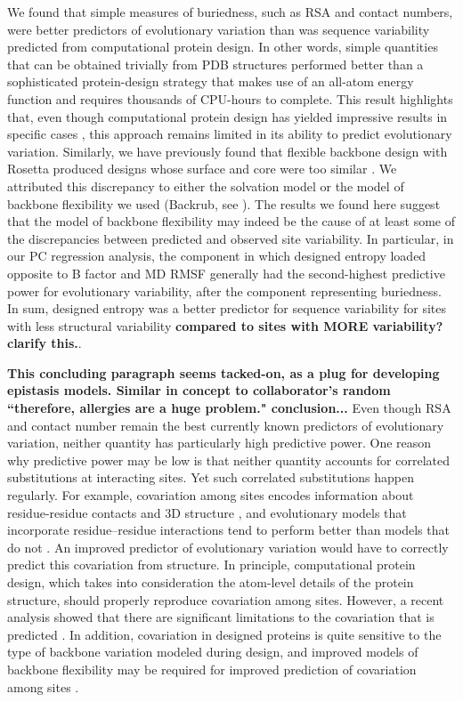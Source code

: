 \documentclass[smallextended]{svjour3}
\begin{document}
We found that simple measures of buriedness, such as RSA and contact numbers, were better predictors of evolutionary variation than was sequence variability predicted from computational protein design. In other words, simple quantities that can be obtained trivially from PDB structures performed better than a sophisticated protein-design strategy that makes use of an all-atom energy function and requires thousands of CPU-hours to complete. This result highlights that, even though computational protein design has yielded impressive results in specific cases \citep{Kuhlman2003,Rothlisberger2008,Fleishman2011}, this approach remains limited in its ability to predict evolutionary variation. Similarly, we have previously found that flexible backbone design with Rosetta produced designs whose surface and core were too similar \citep{Jacksonetal2013}. We attributed this discrepancy to either the solvation model or the model of backbone flexibility we used (Backrub, see \citealt{Smith2008}). The results we found here suggest that the model of backbone flexibility may indeed be the cause of at least some of the discrepancies between predicted and observed site variability. In particular, in our PC regression analysis, the component in which designed entropy loaded opposite to B factor and MD RMSF generally had the second-highest predictive power for evolutionary variability, after the component representing buriedness. In sum, designed entropy was a better predictor for sequence variability for sites with less structural variability \textbf{compared to sites with MORE variability? clarify this.}.

\textbf{This concluding paragraph seems tacked-on, as a plug for developing epistasis models. Similar in concept to collaborator's random ``therefore, allergies are a huge problem." conclusion...}
Even though RSA and contact number remain the best currently known predictors of evolutionary variation, neither quantity has particularly high predictive power. One reason why predictive power may be low is that neither quantity accounts for correlated substitutions at interacting sites.  Yet such correlated substitutions happen regularly. For example, covariation among sites encodes information about residue-residue contacts and 3D structure \citep{Halabietal2009,BurgervanNimwegen2010,Marksetal2011,Jonesetal2014}, and evolutionary models that incorporate residue--residue interactions tend to perform better than models that do not \citep{Rodrigueetal2005,BordnerMittelmann2014}. An improved predictor of evolutionary variation would have to correctly predict this covariation from structure. In principle, computational protein design, which takes into consideration the atom-level details of the protein structure, should properly reproduce covariation among sites. However, a recent analysis showed that there are significant limitations to the covariation that is predicted \citep{OllikainenKortemme2013}. In addition, covariation in designed proteins is quite sensitive to the type of backbone variation modeled during design, and improved models of backbone flexibility may be required for improved prediction of covariation among sites \citep{OllikainenKortemme2013}.
\end{document}
